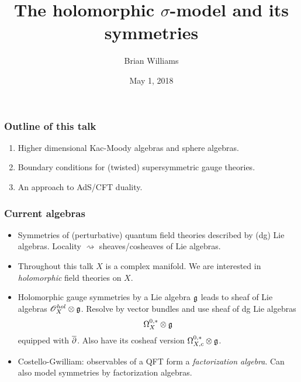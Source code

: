 \documentclass[10pt]{beamer}
\title{The holomorphic $\sigma$-model and its symmetries}
\author{Brian Williams}
\institute{Northwestern University \\ Advisors: John Francis and Kevin Costello}
\date{May 1, 2018}
\begin{document}
\frame{\titlepage}

\begin{frame}
\frametitle{Outline of this talk}
\begin{enumerate}
\item Higher dimensional Kac-Moody algebras and sphere algebras.
\item Boundary conditions for (twisted) supersymmetric gauge theories.
\item An approach to AdS/CFT duality.
\end{enumerate}
\end{frame}

\begin{frame}
\frametitle{Current algebras}

\begin{itemize}
\item Symmetries of (perturbative) quantum field theories described by (dg) Lie algebras. 
Locality $\rightsquigarrow$ sheaves/cosheaves of Lie algebras.
\item Throughout this talk $X$ is a complex manifold. 
We are interested in {\em holomorphic} field theories on $X$.
\item Holomorphic gauge symmetries by a Lie algebra $\mathfrak g$ leads to sheaf of Lie algebras $\mathscr O^{hol}_X \otimes \mathfrak g$. 
Resolve by vector bundles and use sheaf of dg Lie algebras $$\Omega^{0,*}_X \otimes \mathfrak g$$ equipped with $\overline{\partial}$. 
Also have its cosheaf version $\Omega^{0,*}_{X,c} \otimes \mathfrak g$. 
\item Costello-Gwilliam: observables of a QFT form a {\em factorization algebra}. 
Can also model symmetries by factorization algebras. 
\end{itemize}

\end{frame}
\end{document}
